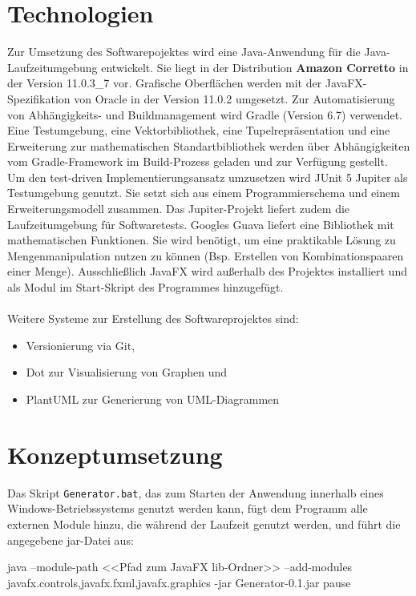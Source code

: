 \section{Technologien}
Zur Umsetzung des Softwarepojektes wird eine Java-Anwendung für die Java-Laufzeitumgebung entwickelt.
Sie liegt in der Distribution \textbf{Amazon Corretto} in der Version 11.0.3\_7 vor.
Grafische Oberflächen werden mit der JavaFX-Spezifikation von Oracle in der Version 11.0.2 umgesetzt.
Zur Automatisierung von Abhängigkeits- und Buildmanagement wird Gradle (Version 6.7) verwendet.
Eine Testumgebung, eine Vektorbibliothek, eine Tupelrepräsentation und eine Erweiterung zur mathematischen
Standartbibliothek werden über Abhängigkeiten vom Gradle-Framework im Build-Prozess geladen und zur Verfügung
gestellt.\\
Um den test-driven Implementierungsansatz umzusetzen wird JUnit 5 Jupiter als Testumgebung genutzt.
Sie setzt sich aus einem Programmierschema und einem Erweiterungsmodell zusammen.
Das Jupiter-Projekt liefert zudem die Laufzeitumgebung für Softwaretests.
Googles Guava liefert eine Bibliothek mit mathematischen Funktionen.
Sie wird benötigt, um eine praktikable Lösung zu Mengenmanipulation nutzen zu können (Bsp. Erstellen
von Kombinationspaaren einer Menge).
Ausschließlich JavaFX wird außerhalb des Projektes installiert und als Modul im Start-Skript des Programmes
hinzugefügt.
\\~\\
Weitere Systeme zur Erstellung des Softwareprojektes sind:
\begin{itemize}
    \item Versionierung via Git,
    \item Dot zur Visualisierung von Graphen und
    \item PlantUML zur Generierung von UML-Diagrammen
\end{itemize}

\newpage%

\section{Konzeptumsetzung}

Das Skript \texttt{Generator.bat}, das zum Starten der Anwendung innerhalb eines Windows-Betriebssystems genutzt werden kann,
fügt dem Programm alle externen Module hinzu, die während der Laufzeit genutzt werden, und führt die angegebene jar-Datei aus:
\begin{csource}
    java --module-path <<Pfad zum JavaFX lib-Ordner>> --add-modules javafx.controls,javafx.fxml,javafx.graphics -jar Generator-0.1.jar
    pause
\end{csource}


